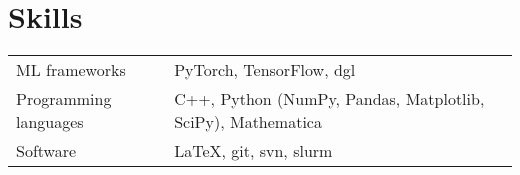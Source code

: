 \documentclass[a4paper,11pt]{article}
\begin{document}
\section{Skills}
\begin{tabularx}{\linewidth}{@{}l X@{}}
ML frameworks & \normalsize{PyTorch, TensorFlow, dgl} \\
Programming languages & \normalsize{C++, Python (NumPy, Pandas, Matplotlib, SciPy), Mathematica} \\
Software & \normalsize{LaTeX, git, svn, slurm}  \\
\end{tabularx}

\vfill
{}
\end{document}
